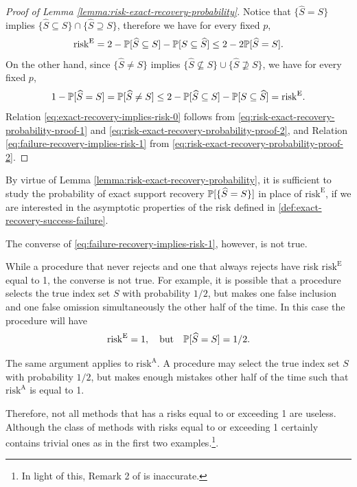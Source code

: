 \begin{proof}[Proof of Lemma \ref{lemma:risk-exact-recovery-probability}]
Notice that $\{\widehat{S}=S\}$ implies $\{\widehat{S}\subseteq S\} \cap \{\widehat{S}\supseteq S\}$, therefore we have for every fixed $p$,
\begin{equation} \label{eq:risk-exact-recovery-probability-proof-1}
    \mathrm{risk}^{\mathrm{E}} 
    = 2 - \P[\widehat{S} \subseteq S] - \P[S \subseteq \widehat{S}] \\
    \le 2 - 2\P[\widehat{S}=S].
\end{equation}
On the other hand, since $\{\widehat{S}\neq S\}$ implies $\{\widehat{S}\not\subseteq S\} \cup \{\widehat{S}\not\supseteq S\}$, we have for every fixed $p$,
\begin{equation} \label{eq:risk-exact-recovery-probability-proof-2}
    1 - \P[\widehat{S}=S]
    = \P[\widehat{S}\neq S]
    \le 2 - \P[\widehat{S} \subseteq S] - \P[S \subseteq \widehat{S}]
    = \mathrm{risk}^{\mathrm{E}}. 
\end{equation}
Relation \eqref{eq:exact-recovery-implies-risk-0} follows from \eqref{eq:risk-exact-recovery-probability-proof-1} and \eqref{eq:risk-exact-recovery-probability-proof-2}, and Relation \eqref{eq:failure-recovery-implies-risk-1} from \eqref{eq:risk-exact-recovery-probability-proof-2}.
\end{proof}

\begin{remark}
By virtue of Lemma \ref{lemma:risk-exact-recovery-probability}, it is sufficient to study the probability of exact support recovery $\P[\{\widehat{S}=S\}]$ in place of $\mathrm{risk}^{\mathrm{E}}$, if we are interested in the asymptotic properties of the risk defined in \eqref{def:exact-recovery-success-failure}.
\end{remark}

The converse of \eqref{eq:failure-recovery-implies-risk-1}, however, is not true.

\begin{remark} \label{rmk:asymptotic-risks}
While a procedure that never rejects and one that always rejects have risk $\mathrm{risk}^{\mathrm{E}}$ equal to 1, the converse is not true.
For example, it is possible that a procedure selects the true index set $S$ with probability $1/2$, but makes one false inclusion and one false omission simultaneously the other half of the time. 
In this case the procedure will have 
$$\mathrm{risk}^{\mathrm{E}} = 1, \quad \text{but} \quad \P[\widehat{S}=S] = 1/2.$$
 
The same argument applies to $\mathrm{risk}^{\mathrm{A}}$. 
A procedure may select the true index set $S$ with probability $1/2$, but makes enough mistakes other half of the time such that $\mathrm{risk}^{\mathrm{A}}$ is equal to 1. 

Therefore, not all methods that has a risks equal to or exceeding 1 are useless. 
Although the class of methods with risks equal to or exceeding 1 certainly contains trivial ones as in the first two examples.\footnote{In light of this, Remark 2 of \citet*{arias2017distribution} is inaccurate.}.
\end{remark}


